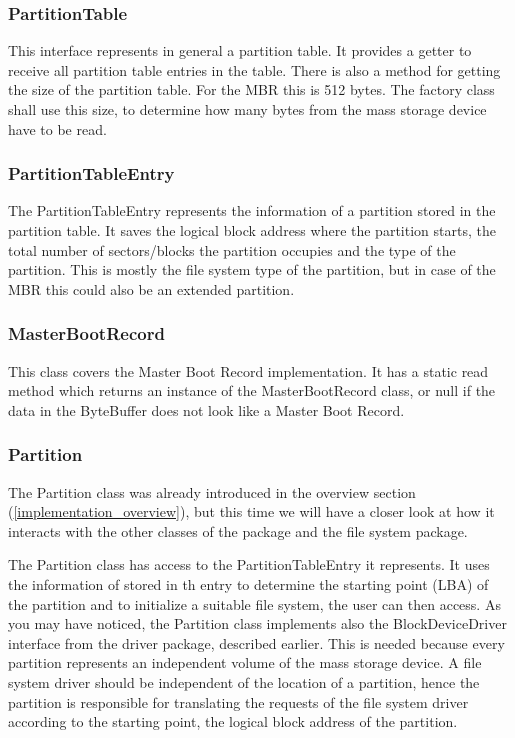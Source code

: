 \subsubsection{PartitionTable}

This interface represents in general a partition table. It provides a getter to receive all partition table entries in the table. There is also a method for getting the size of the partition table. For the MBR this is 512 bytes. The factory class shall use this size, to determine how many bytes from the mass storage device have to be read.

\subsubsection{PartitionTableEntry}

The PartitionTableEntry represents the information of a partition stored in the partition table. It saves the logical block address where the partition starts, the total number of sectors/blocks the partition occupies and the type of the partition. This is mostly the file system type of the partition, but in case of the MBR this could also be an extended partition.

\subsubsection{MasterBootRecord}

This class covers the Master Boot Record implementation. It has a static read method which returns an instance of the MasterBootRecord class, or null if the data in the ByteBuffer does not look like a Master Boot Record.

\subsubsection{Partition}

The Partition class was already introduced in the overview section (\ref{implementation_overview}), but this time we will have a closer look at how it interacts with the other classes of the package and the file system package. 

The Partition class has access to the PartitionTableEntry it represents. It uses the information of stored in th entry to determine the starting point (LBA) of the partition and to initialize a suitable file system, the user can then access. As you may have noticed, the Partition class implements also the BlockDeviceDriver interface from the driver package, described earlier. This is needed because every partition represents an independent volume of the mass storage device. A file system driver should be independent of the location of a partition, hence the partition is responsible for translating the requests of the file system driver according to the starting point, the logical block address of the partition.

